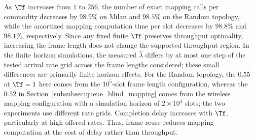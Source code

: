 As \(\Tf\) increases from \(1\) to \(256\), the number of exact mapping calls per commodity decreases by \(98.9\%\) on Milan and \(98.5\%\) on the Random topology, while the amortized mapping computation time per slot decreases by \(98.8\%\) and \(98.1\%\), respectively. Since any fixed finite \(\Tf\) preserves throughput optimality, increasing the frame length does not change the supported throughput region. In the finite horizon simulations, the measured \(\hat\lambda\) differs by at most one step of the tested arrival rate grid across the frame lengths considered; these small differences are primarily finite horizon effects. For the Random topology, the \(0.55\) at \(\Tf=1\) here comes from the \(10^5\)-slot frame length configuration, whereas the \(0.52\) in Section~\ref{subsubsec:queue_blind_mapping} comes from the wireless mapping configuration with a simulation horizon of \(2\times10^4\) slots; the two experiments use different rate grids. Completion delay increases with \(\Tf\), particularly at high offered rates. Thus, frame reuse reduces mapping computation at the cost of delay rather than throughput.
